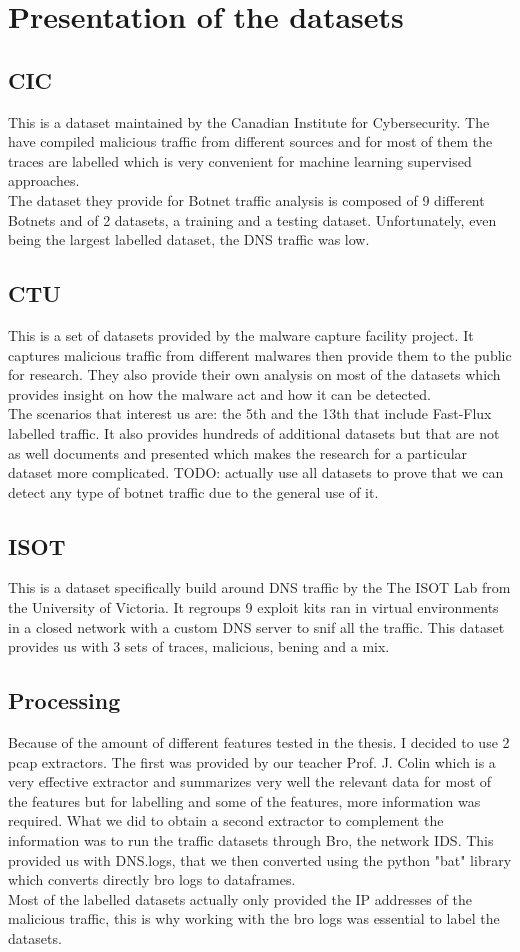 \section{Presentation of the datasets}
\subsection{CIC}
This is a dataset maintained by the Canadian Institute for Cybersecurity. The have compiled malicious traffic from different sources and for most of them the traces are labelled which is very convenient for machine learning supervised approaches.\\ 
The dataset they provide for Botnet traffic analysis is composed of 9 different Botnets and of 2 datasets, a training and a testing dataset. Unfortunately, even being the largest labelled  dataset, the DNS traffic was low. 
\subsection{CTU}
This is a set of datasets provided by the malware capture facility project\cite{CTU}. It captures malicious traffic from different malwares then provide them to the public for research. They also provide their own analysis on most of the datasets which provides insight on how the malware act and how it can be detected.\\
The scenarios that interest us are: the 5th and the 13th that include Fast-Flux labelled traffic.
It also provides hundreds of additional datasets but that are not as well documents and presented which makes the research for a particular dataset more complicated.
TODO: actually use all datasets to prove that we can detect any type of botnet traffic due to the general use of it.
\subsection{ISOT}
This is a dataset specifically build around DNS traffic by the The ISOT Lab from the University of Victoria. It regroups 9 exploit kits ran in virtual environments in a closed network with a custom DNS server to snif all the traffic. This dataset provides us with 3 sets of traces, malicious, bening and a mix\cite{ISOT}.
\subsection{Processing}
Because of the amount of different features tested in the thesis. I decided to use 2 pcap extractors. The first was provided by our teacher Prof. J. Colin which is a very effective extractor and summarizes very well the relevant data for most of the features but for labelling and some of the features, more information was required. What we did to obtain a second extractor to complement the information was to run the traffic datasets through Bro, the network IDS. This provided us with DNS.logs, that we then converted using the python "bat" library which converts directly bro logs to dataframes.\\
Most of the labelled datasets actually only provided the IP addresses of the malicious traffic, this is why working with the bro logs was essential to label the datasets.

